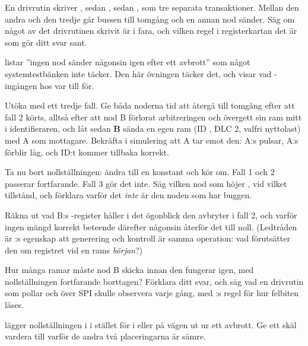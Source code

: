  En drivrutin skriver , sedan , sedan , som tre
separata transaktioner. Mellan den andra och den tredje går bussen till tomgång och en annan nod
sänder. Säg om något av det drivrutinen skrivit är i fara, och vilken regel i registerkartan det är
som gör ditt svar sant.

\label{c19:ex:afterabort}
 listar ”ingen nod sänder någonsin igen efter ett avbrott” som något
systemtestbänken inte täcker. Den här övningen täcker det, och visar vad -ingången hos
 var till för.

 Utöka  med ett tredje fall. Ge båda noderna tid att återgå till
tomgång efter att fall 2 körts, alltså efter att nod B förlorat arbitreringen och övergett sin ram
mitt i identifieraren, och låt sedan \textbf{B} sända en egen ram (ID , DLC 2, valfri
nyttolast) med A som mottagare. Bekräfta i simulering att A tar emot den: A:s  pulsar,
A:s  förblir låg, och ID:t kommer tillbaka korrekt.

 Ta nu bort nollställningen: ändra  till en konstant  och kör om.
Fall 1 och 2 passerar fortfarande. Fall 3 gör det inte. Säg vilken nod som höjer , vid
vilket tillstånd, och förklara varför det \emph{inte} är den noden som har buggen.

 Räkna ut vad B:s -register håller i det ögonblick den avbryter i fall 2, och
varför ingen mängd korrekt beteende därefter någonsin återför det till noll. (Ledtråden är
:s egenskap att generering och kontroll är samma operation: vad förutsätter den om
registret vid en rams \emph{början}?)

 Hur många ramar måste nod B skicka innan den fungerar igen, med nollställningen fortfarande
borttagen? Förklara ditt svar, och säg vad en drivrutin som pollar  och
 över SPI skulle observera varje gång, med :s regel för hur felbiten
låses.

  lägger nollställningen i  i stället för i
 eller på vägen ut ur ett avbrott. Ge ett skäl vardera till varför de andra två
placeringarna är sämre.
